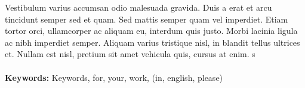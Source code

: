 Vestibulum varius accumsan odio malesuada gravida. Duis a erat et arcu tincidunt semper sed et quam. Sed mattis semper quam vel imperdiet. Etiam tortor orci, ullamcorper ac aliquam eu, interdum quis justo. Morbi lacinia ligula ac nibh imperdiet semper. Aliquam varius tristique nisl, in blandit tellus ultrices et. Nullam est nisl, pretium sit amet vehicula quis, cursus at enim.
s\\ 
\\
\textbf{Keywords:} Keywords, for, your, work, (in, english, please)